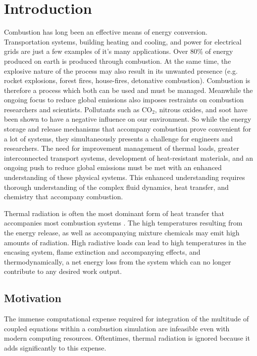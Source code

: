 \addchapheadtotoc

\chapter{Introduction} \label{chapter:Introduction}
Combustion has long been an effective means of energy conversion. Transportation systems, building heating and cooling, and power for electrical grids are just a few examples of it's many applications. Over 80\% of energy produced on earth is produced through combustion. 
At the same time, the explosive nature of the process may also result in its unwanted presence (e.g. rocket explosions, forest fires, house-fires, detonative combustion).
Combustion is therefore a process which both can be used and must be managed. 
Meanwhile the ongoing focus to reduce global emissions also imposes restraints on combustion researchers and scientists. Pollutants such as CO${}_2$, nitrous oxides, and soot have been shown to have a negative influence on our environment.
So while the energy storage and release mechanisms that accompany combustion prove convenient for a lot of systems, they simultaneously presents a challenge for engineers and researchers.
The need for improvement management of thermal loads, greater interconnected transport systems, development of heat-resistant materials, and an ongoing push to reduce global emissions must be met with an enhanced understanding of these physical systems.
This enhanced understanding requires thorough understanding of the complex fluid dynamics, heat transfer, and chemistry that accompany combustion.

Thermal radiation is often the most dominant form of heat transfer that accompanies most combustion systems \cite{Coelho2018RadiativeSystems}.
The high temperatures resulting from the energy release, as well as accompanying mixture chemicals may emit high amounts of radiation. 
High radiative loads can lead to high temperatures in the encasing system, flame extinction and accompanying effects, and thermodynamically, a net energy loss from the system which can no longer contribute to any desired work output.


\section{Motivation}
The immense computational expense required for integration of the multitude of coupled equations within a combustion simulation are infeasible even with modern computing resources. Oftentimes, thermal radiation is ignored because it adds significantly to this expense.

